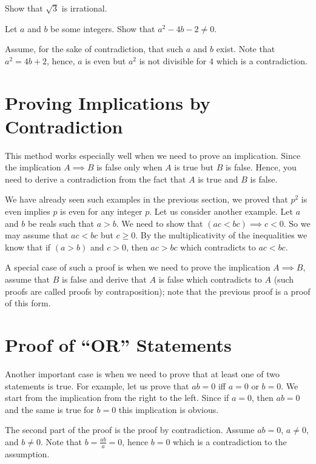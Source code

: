 \begin{exercise}
  Show that $\sqrt{3}$ is irrational.
\end{exercise}

\begin{exercise}
  Let $a$ and $b$ be some integers. Show that $a^2 - 4b - 2 \neq 0$.
\end{exercise}
\begin{solution}
  Assume, for the sake of contradiction, that such $a$ and $b$ exist. Note that
  $a^2 = 4b + 2$, hence, $a$ is even but $a^2$ is not divisible for $4$ which is a
  contradiction.
\end{solution}

\section{Proving Implications by Contradiction}
This method works especially well when we need to prove an implication.
Since the implication $A \implies B$ is false only when $A$ is true but $B$ is
false. Hence, you need to derive a contradiction from the fact that $A$ is true
and $B$ is false.

We have already seen such examples in the previous section, we proved that
$p^2$ is even implies $p$ is even for any integer $p$. Let us consider another
example. Let $a$ and $b$ be reals such that $a > b$. We need to show that
$(ac < bc) \implies c < 0$. So we may assume that $ac < bc$ but $c \ge 0$. By
the multiplicativity of the inequalities we know that if $(a > b)$ and $c > 0$,
then $ac > bc$ which contradicts to $ac < bc$.

A special case of such a proof is when we need to prove the implication
$A \implies B$, assume that $B$ is false and derive that $A$ is false which
contradicts to  $A$ (such proofs are called proofs by contraposition); note
that the previous proof is a proof of this form.

\section{Proof of ``OR'' Statements}
Another important case is when we need to prove that at least one of two
statements is true. For example, let us prove that $ab = 0$ iff $a = 0$ or
$b = 0$. We start from the implication from the right to the left. Since if
$a = 0$, then $ab = 0$ and the same is true for $b = 0$ this implication is
obvious.

The second part of the proof is the proof by contradiction. Assume $ab = 0$,
$a \neq 0$, and $b \neq 0$. Note that $b = \frac{ab}{a} = 0$,
hence $b = 0$ which is a contradiction to the assumption.


